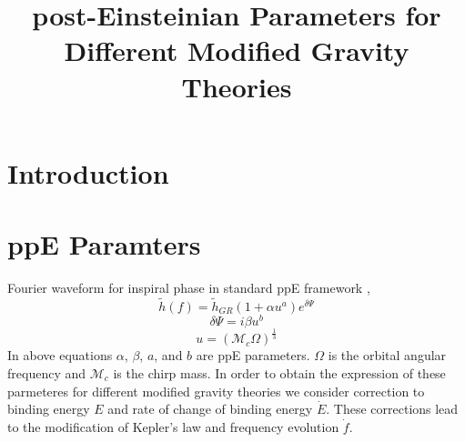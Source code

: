 \documentclass[11pt]{article}
\begin{document}
\title{post-Einsteinian Parameters for Different Modified Gravity Theories}
\maketitle
\section{Introduction}

\section{ppE Paramters}\label{section:intro}
\hspace*{15.5pt}Fourier waveform for inspiral phase in standard ppE framework \cite{Yunes:2009ke},
\begin{equation}\label{eq:1}
\tilde{h}(f)=\tilde{h}_{GR}(1+\alpha u^a)e^{\delta\Psi}
\end{equation}
\begin{equation}\label{eq:2}
\delta\Psi=i\beta u^b
\end{equation}
\begin{equation}
u=(\mathcal{M}_c \Omega)^\frac{1}{3}
\end{equation}
\hspace*{20pt}In above equations $\alpha$, $\beta$, $a$, and $b$ are ppE parameters. $\Omega$ is the orbital angular frequency and $\mathcal{M}_c$ is the chirp mass. In order to obtain the expression of these parmeteres for different modified gravity theories we consider correction to binding energy $E$ and rate of change of binding energy $\dot{E}$. These corrections lead to the modification of Kepler's law and frequency evolution $\dot{f}$.\\
\end{document}
